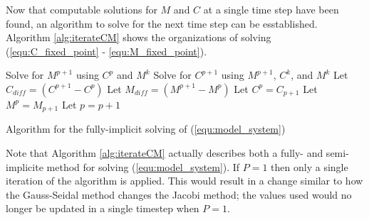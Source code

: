 Now that computable solutions for $M$ and $C$ at a single time step have been found, an algorithm to solve for the next time step can be esstablished.
Algorithm \ref{alg:iterateCM} shows the organizations of solving (\ref{equ:C_fixed_point} - \ref{equ:M_fixed_point}). 
\begin{algorithm}
  \Begin
  {
    {
        Solve for $M^{p+1}$ using $C^{p}$ and $M^{k}$\;
        Solve for $C^{p+1}$ using $M^{p+1}$, $C^{k}$, and $M^{k}$\;
        Let $C_{diff} = (C^{p+1} - C^p)$\;
        Let $M_{diff} = (M^{p+1} - M^p)$\;
        Let $C^{p} = C_{p+1}$\;
        Let $M^{p} = M_{p+1}$\;
        Let $p = p + 1 $\;
    }
  }
  \caption{Algorithm for the fully-implicit solving of (\ref{equ:model_system}) }
  \label{alg:iterateCM}
\end{algorithm}
Note that Algorithm \ref{alg:iterateCM} actually describes both a fully- and semi- implicite method for solving (\ref{equ:model_system}). 
If $P = 1$ then only a single iteration of the algorithm is applied.
This would result in a change similar to how the Gauss-Seidal method changes the Jacobi method; the values used would no longer be updated in a single timestep when $P = 1$.


